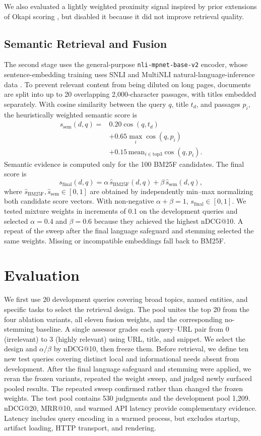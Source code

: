 \documentclass{article}
\begin{document}
We also evaluated a lightly weighted proximity signal inspired by prior
extensions of Okapi scoring \citep{rasolofo2003}, but disabled it because it did
not improve retrieval quality.

\subsection{Semantic Retrieval and Fusion}
The second stage uses the general-purpose
\texttt{nli-mpnet-base-v2} encoder, whose sentence-embedding training uses
SNLI and MultiNLI natural-language-inference data
\citep{nli-mpnet-base-v2}. To prevent relevant content from being diluted on
long pages, documents are split into up to 20 overlapping 2,000-character
passages, with titles embedded separately. With cosine
similarity between the query $q$, title $t_d$, and passages $p_i$, the
heuristically weighted semantic score is
\[
\begin{array}{rl}
s_{\mathrm{sem}}(d,q)={}&0.20\cos(q,t_d)\\
&+0.65\max_i\cos(q,p_i)\\
&+0.15\,\mathrm{mean}_{i\in\mathrm{top3}}\cos(q,p_i).
\end{array}
\]
Semantic evidence is computed only for the 100 BM25F candidates. The final
score is
\[
s_{\mathrm{final}}(d,q)=\alpha\,\hat{s}_{\mathrm{BM25F}}(d,q)
  +\beta\,\hat{s}_{\mathrm{sem}}(d,q),
\]
where $\hat{s}_{\mathrm{BM25F}},\hat{s}_{\mathrm{sem}}\in[0,1]$ are obtained
by independently min--max normalizing both candidate score vectors. With
non-negative $\alpha+\beta=1$, $s_{\mathrm{final}}\in[0,1]$. We tested mixture
weights in increments of 0.1 on the development queries and selected
$\alpha=0.4$ and $\beta=0.6$ because they achieved the highest nDCG@10. A
repeat of the sweep after the final language safeguard and stemming selected
the same weights.
Missing or incompatible embeddings fall back to BM25F.

\section{Evaluation}
We first use 20 development queries covering broad topics, named entities, and
specific tasks to select the retrieval design. The pool unites the top 20 from
the four ablation variants, all eleven fusion weights, and the corresponding
no-stemming baseline. A single assessor grades each query--URL pair from 0
(irrelevant) to 3 (highly relevant) using URL, title, and snippet. We select
the design and
$\alpha/\beta$ by nDCG@10, then freeze them. Before retrieval, we define ten
new test queries covering distinct local and informational needs absent from
development. After the final language safeguard and stemming were applied, we
reran the frozen variants, repeated the weight sweep, and judged newly surfaced
pooled results. The repeated sweep confirmed rather than changed the frozen
weights. The test pool contains 530 judgments and the development pool 1,209. nDCG@20,
MRR@10, and warmed API latency provide complementary evidence.
Latency includes query encoding in a warmed process, but excludes startup,
artifact loading, HTTP transport, and rendering.
\end{document}
